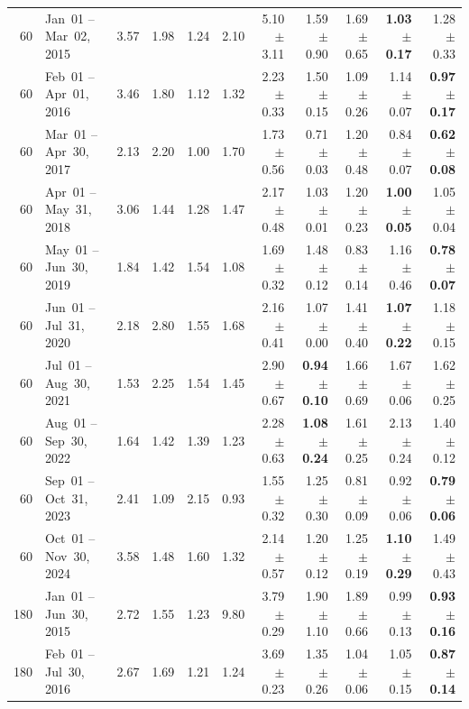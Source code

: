 \begin{longtable}{r l r r r r r r r r r}
60 & Jan~01 -- Mar~02, 2015 & 3.57 & 1.98 & 1.24 & 2.10 & 5.10{\tiny$\pm$3.11} & 1.59{\tiny$\pm$0.90} & 1.69{\tiny$\pm$0.65} & \textbf{1.03{\tiny$\pm$0.17}} & 1.28{\tiny$\pm$0.33} \\
60 & Feb~01 -- Apr~01, 2016 & 3.46 & 1.80 & 1.12 & 1.32 & 2.23{\tiny$\pm$0.33} & 1.50{\tiny$\pm$0.15} & 1.09{\tiny$\pm$0.26} & 1.14{\tiny$\pm$0.07} & \textbf{0.97{\tiny$\pm$0.17}} \\
60 & Mar~01 -- Apr~30, 2017 & 2.13 & 2.20 & 1.00 & 1.70 & 1.73{\tiny$\pm$0.56} & 0.71{\tiny$\pm$0.03} & 1.20{\tiny$\pm$0.48} & 0.84{\tiny$\pm$0.07} & \textbf{0.62{\tiny$\pm$0.08}} \\
60 & Apr~01 -- May~31, 2018 & 3.06 & 1.44 & 1.28 & 1.47 & 2.17{\tiny$\pm$0.48} & 1.03{\tiny$\pm$0.01} & 1.20{\tiny$\pm$0.23} & \textbf{1.00{\tiny$\pm$0.05}} & 1.05{\tiny$\pm$0.04} \\
60 & May~01 -- Jun~30, 2019 & 1.84 & 1.42 & 1.54 & 1.08 & 1.69{\tiny$\pm$0.32} & 1.48{\tiny$\pm$0.12} & 0.83{\tiny$\pm$0.14} & 1.16{\tiny$\pm$0.46} & \textbf{0.78{\tiny$\pm$0.07}} \\
60 & Jun~01 -- Jul~31, 2020 & 2.18 & 2.80 & 1.55 & 1.68 & 2.16{\tiny$\pm$0.41} & 1.07{\tiny$\pm$0.00} & 1.41{\tiny$\pm$0.40} & \textbf{1.07{\tiny$\pm$0.22}} & 1.18{\tiny$\pm$0.15} \\
60 & Jul~01 -- Aug~30, 2021 & 1.53 & 2.25 & 1.54 & 1.45 & 2.90{\tiny$\pm$0.67} & \textbf{0.94{\tiny$\pm$0.10}} & 1.66{\tiny$\pm$0.69} & 1.67{\tiny$\pm$0.06} & 1.62{\tiny$\pm$0.25} \\
60 & Aug~01 -- Sep~30, 2022 & 1.64 & 1.42 & 1.39 & 1.23 & 2.28{\tiny$\pm$0.63} & \textbf{1.08{\tiny$\pm$0.24}} & 1.61{\tiny$\pm$0.25} & 2.13{\tiny$\pm$0.24} & 1.40{\tiny$\pm$0.12} \\
60 & Sep~01 -- Oct~31, 2023 & 2.41 & 1.09 & 2.15 & 0.93 & 1.55{\tiny$\pm$0.32} & 1.25{\tiny$\pm$0.30} & 0.81{\tiny$\pm$0.09} & 0.92{\tiny$\pm$0.06} & \textbf{0.79{\tiny$\pm$0.06}} \\
60 & Oct~01 -- Nov~30, 2024 & 3.58 & 1.48 & 1.60 & 1.32 & 2.14{\tiny$\pm$0.57} & 1.20{\tiny$\pm$0.12} & 1.25{\tiny$\pm$0.19} & \textbf{1.10{\tiny$\pm$0.29}} & 1.49{\tiny$\pm$0.43} \\
\midrule
180 & Jan~01 -- Jun~30, 2015 & 2.72 & 1.55 & 1.23 & 9.80 & 3.79{\tiny$\pm$0.29} & 1.90{\tiny$\pm$1.10} & 1.89{\tiny$\pm$0.66} & 0.99{\tiny$\pm$0.13} & \textbf{0.93{\tiny$\pm$0.16}} \\
180 & Feb~01 -- Jul~30, 2016 & 2.67 & 1.69 & 1.21 & 1.24 & 3.69{\tiny$\pm$0.23} & 1.35{\tiny$\pm$0.26} & 1.04{\tiny$\pm$0.06} & 1.05{\tiny$\pm$0.15} & \textbf{0.87{\tiny$\pm$0.14}} \\

\end{longtable}
